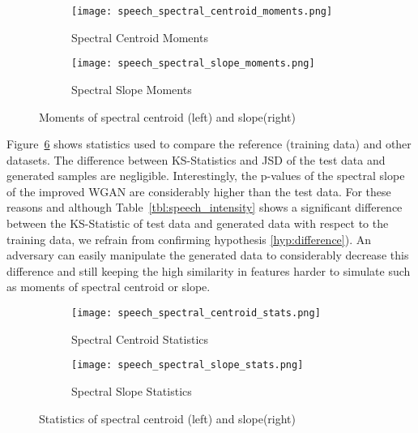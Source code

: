 \begin{figure}[!h]
    \centering
    \begin{subfigure}[b]{0.45\textwidth}
        \texttt{[image: speech\_spectral\_centroid\_moments.png]}
        \caption{Spectral Centroid Moments}
        \label{fig:speech_spectral_centroid_moments}
    \end{subfigure}
    \quad
    \begin{subfigure}[b]{0.45\textwidth}
        \texttt{[image: speech\_spectral\_slope\_moments.png]}
        \caption{Spectral Slope Moments}
        \label{fig:speech_spectral_slope_moments}
    \end{subfigure}
    \caption{Moments of spectral centroid (left) and slope(right)}
    \label{fig:speech_moments}
\end{figure}

Figure~\ref{fig:speech_spectral_stats} shows statistics used to compare the
reference (training data) and other datasets. The difference between
KS-Statistics and JSD of the test data and generated samples are negligible.
Interestingly, the p-values of the spectral slope of the improved WGAN are considerably
higher than the test data. For these reasons and although 
Table~\ref{tbl:speech_intensity} shows a significant difference between the 
KS-Statistic of test data and generated data with respect to the training
data, we refrain from confirming hypothesis \ref{hyp:difference}). An adversary
can easily manipulate the generated data to considerably decrease 
this difference and still keeping the high similarity in features harder to
simulate such as moments of spectral centroid or slope. 

\begin{figure}[!h]
    \centering
    \begin{subfigure}[b]{.45\textwidth}
        \texttt{[image: speech\_spectral\_centroid\_stats.png]}
        \caption{Spectral Centroid Statistics}
        \label{fig:speech_spectral_centroid_stats}
    \end{subfigure}
    \quad
    \begin{subfigure}[b]{.45\textwidth}
        \texttt{[image: speech\_spectral\_slope\_stats.png]}
        \caption{Spectral Slope Statistics}
        \label{fig:speech_spectral_slope_stats}
    \end{subfigure}
    \caption{Statistics of spectral centroid (left) and slope(right)}
    \label{fig:speech_spectral_stats}
\end{figure}
